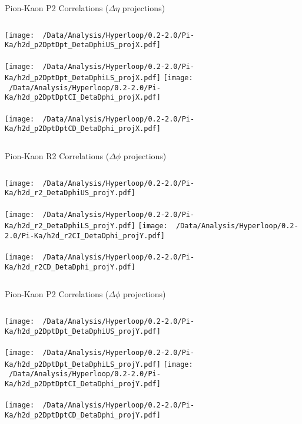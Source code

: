 \documentclass{beamer}
\begin{document}
\begin{frame}{Pion-Kaon P2 Correlations ($\Delta\eta$ projections)}
	\begin{columns}
		\centering
		\texttt{[image: ~/Data/Analysis/Hyperloop/0.2-2.0/Pi-Ka/h2d\_p2DptDpt\_DetaDphiUS\_projX.pdf]}\\~\\
		\texttt{[image: ~/Data/Analysis/Hyperloop/0.2-2.0/Pi-Ka/h2d\_p2DptDpt\_DetaDphiLS\_projX.pdf]}
		\centering
		\texttt{[image: ~/Data/Analysis/Hyperloop/0.2-2.0/Pi-Ka/h2d\_p2DptDptCI\_DetaDphi\_projX.pdf]}\\~\\
		\texttt{[image: ~/Data/Analysis/Hyperloop/0.2-2.0/Pi-Ka/h2d\_p2DptDptCD\_DetaDphi\_projX.pdf]}
	\end{columns}
\end{frame}
\begin{frame}{Pion-Kaon R2 Correlations ($\Delta\phi$ projections)}
	\begin{columns}
		\column{0.5\linewidth}
		\centering
		\texttt{[image: ~/Data/Analysis/Hyperloop/0.2-2.0/Pi-Ka/h2d\_r2\_DetaDphiUS\_projY.pdf]}\\~\\
		\texttt{[image: ~/Data/Analysis/Hyperloop/0.2-2.0/Pi-Ka/h2d\_r2\_DetaDphiLS\_projY.pdf]}
		\column{0.5\linewidth}
		\centering
		\texttt{[image: ~/Data/Analysis/Hyperloop/0.2-2.0/Pi-Ka/h2d\_r2CI\_DetaDphi\_projY.pdf]}\\~\\
		\texttt{[image: ~/Data/Analysis/Hyperloop/0.2-2.0/Pi-Ka/h2d\_r2CD\_DetaDphi\_projY.pdf]}
	\end{columns}
\end{frame}
\begin{frame}{Pion-Kaon P2 Correlations ($\Delta\phi$ projections)}
	\begin{columns}
		\centering
		\texttt{[image: ~/Data/Analysis/Hyperloop/0.2-2.0/Pi-Ka/h2d\_p2DptDpt\_DetaDphiUS\_projY.pdf]}\\~\\
		\texttt{[image: ~/Data/Analysis/Hyperloop/0.2-2.0/Pi-Ka/h2d\_p2DptDpt\_DetaDphiLS\_projY.pdf]}
		\centering
		\texttt{[image: ~/Data/Analysis/Hyperloop/0.2-2.0/Pi-Ka/h2d\_p2DptDptCI\_DetaDphi\_projY.pdf]}\\~\\
		\texttt{[image: ~/Data/Analysis/Hyperloop/0.2-2.0/Pi-Ka/h2d\_p2DptDptCD\_DetaDphi\_projY.pdf]}
	\end{columns}
\end{frame}
\end{document}
